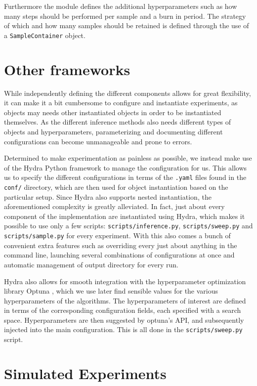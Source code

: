 Furthermore the module defines the additional hyperparameters such as how many steps should be performed per sample and a burn in period.
The strategy of which and how many samples should be retained is defined through the use of a \texttt{SampleContainer} object.

\section{Other frameworks}

While independently defining the different components allows for great flexibility, it can make it a bit cumbersome to configure and instantiate experiments, as objects may needs other instantiated objects in order to be instantiated themselves.
As the different inference methods also needs different types of objects and hyperparameters, parameterizing and documenting different configurations can become unmanageable and prone to errors.

Determined to make experimentation as painless as possible, we instead make use of the Hydra Python framework to manage the configuration for us.  
This allows us to specify the different configurations in terms of the \texttt{.yaml} files found in the \texttt{conf/} directory, which are then used for object instantiation based on the particular setup. 
Since Hydra also supports nested instantiation, the aforementioned complexity is greatly alleviated.
In fact, just about every component of the implementation are instantiated using Hydra, which makes it possible to use only a few scripts: \texttt{scripts/inference.py}, \texttt{scripts/sweep.py} and \texttt{scripts/sample.py} for every experiment. 
With this also comes a bunch of convenient extra features such as overriding every just about anything in the command line, launching several combinations of configurations at once and automatic management of output directory for every run.

Hydra also allows for smooth integration with the hyperparameter optimization library Optuna \cite{akiba_optuna_2019}, which we use later find sensible values for the various hyperparameters of the algorithms. 
The hyperparameters of interest are defined in terms of the corresponding configuration fields, each specified with a search space. 
Hyperparameters are then suggested by optuna's API, and subsequently injected into the main configuration. 
This is all done in the \texttt{scripts/sweep.py} script.

\section{Simulated Experiments}

